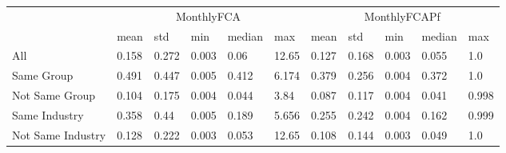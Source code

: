 \begin{tabular}{lllllllllll}
\toprule
 & \multicolumn{5}{c}{MonthlyFCA} & \multicolumn{5}{c}{MonthlyFCAPf} \\
 \cmidrule(lr){2-6} \cmidrule(lr){7-11}
 &       mean &    std &    min & median &    max &         mean &    std &    min & median &    max \\
\midrule
All               &      0.158 &  0.272 &  0.003 &   0.06 &  12.65 &        0.127 &  0.168 &  0.003 &  0.055 &    1.0 \\
Same Group        &      0.491 &  0.447 &  0.005 &  0.412 &  6.174 &        0.379 &  0.256 &  0.004 &  0.372 &    1.0 \\
Not Same Group    &      0.104 &  0.175 &  0.004 &  0.044 &   3.84 &        0.087 &  0.117 &  0.004 &  0.041 &  0.998 \\
Same Industry     &      0.358 &   0.44 &  0.005 &  0.189 &  5.656 &        0.255 &  0.242 &  0.004 &  0.162 &  0.999 \\
Not Same Industry &      0.128 &  0.222 &  0.003 &  0.053 &  12.65 &        0.108 &  0.144 &  0.003 &  0.049 &    1.0 \\
\bottomrule
\end{tabular}
